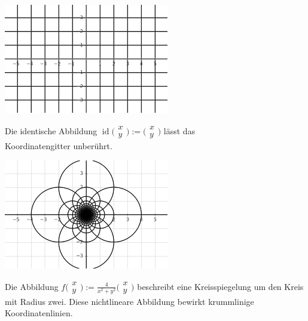 \documentclass[9pt]{beamer}
\newcommand{\id}{\operatorname{id}}
\newcommand{\icol}[1]{
  \big(\!\begin{smallmatrix}#1\end{smallmatrix}\!\big)%
}
\newcommand{\parspace}{\vspace{0.8em}}
\begin{document}
\begin{frame}[t]
\vspace{2em}
\begin{center}
\includegraphics[width=72mm]{img/id.png}

\parspace
Die identische Abbildung $\id\icol{x\\ y}
:= \icol{x\\ y}$ lässt das\\
Koordinatengitter unberührt.
\end{center}
\end{frame}

\begin{frame}[t]
\vspace{2em}
\begin{center}
\includegraphics[width=72mm]{img/non-linear.png}

\parspace
Die Abbildung $f\icol{x\\ y}
:= \tfrac{4}{x^2+y^2}\icol{x\\ y}$
beschreibt eine Kreisspiegelung um den Kreis mit Radius zwei.
Diese nichtlineare Abbildung bewirkt krummlinige
Koordinatenlinien.
\end{center}
\end{frame}
\end{document}
